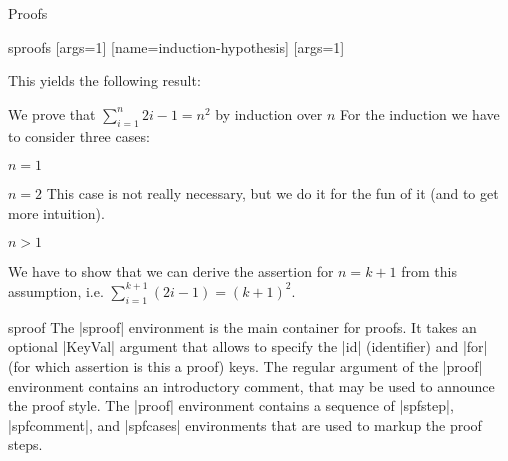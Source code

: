 \begin{sfragment}{Proofs}
\begin{smodule}{sproofs}
[args=1]
[name=induction-hypothesis]
[args=1]

This yields the following result: 

\begin{mdframed}
  \begin{sproof}[id=simple-proof,method=induction]
    {We prove that $\sum_{i=1}^n{2i-1}=n^{2}$ by induction over $n$}
   For the induction we have to consider three cases: %
    \begin{subproof}{$n=1$}
    \end{subproof}
    \begin{subproof}{$n=2$}
         This case is not really necessary, but we do it for the
         fun of it (and to get more intuition).
    \end{subproof}
    \begin{subproof}{$n>1$}\begin{spfblock}
       
         We have to show that we can derive the assertion for $n=k+1$ from
         this assumption, i.e. $\sum_{i=1}^{k+1}{(2i-1)}=(k+1)^{2}$.
 
    \end{spfblock}\end{subproof}
 \end{sproof}
\end{mdframed}

\end{smodule}

\begin{environment}{sproof}
  The |sproof| environment is the main container for proofs. It takes an optional |KeyVal|
  argument that allows to specify the |id| (identifier) and |for| (for which assertion is
  this a proof) keys. The regular argument of the |proof| environment contains an
  introductory comment, that may be used to announce the proof style. The |proof|
  environment contains a sequence of |spfstep|, |spfcomment|, and |spfcases| environments
  that are used to markup the proof steps.
\end{environment}
  

\end{sfragment}
